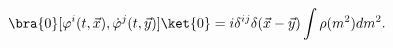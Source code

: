 \begin{equation}
\bra{0}[\varphi^i(t,\vec{x}),\dot{\varphi}^j(t,\vec{y})]\ket{0}
=i\delta^{ij}\delta(\vec{x}-\vec{y})\int\rho(m^2)dm^2.\label{VEVCCR2}
\end{equation}

